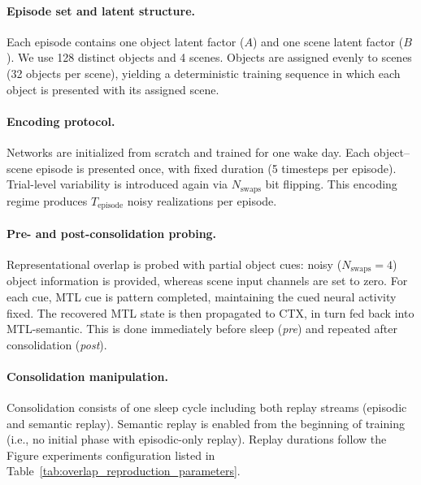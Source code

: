\documentclass{article}
\begin{document}
\paragraph{Episode set and latent structure.}
Each episode contains one object latent factor ($A$) and one scene latent factor ($B$). We use 128 distinct objects and 4 scenes. Objects are assigned evenly to scenes (32 objects per scene), yielding a deterministic training sequence in which each object is presented with its assigned scene.

\paragraph{Encoding protocol.}
Networks are initialized from scratch and trained for one wake day. Each object--scene episode is presented once, with fixed duration (5 timesteps per episode). Trial-level variability is introduced again via $N_\textrm{swaps}$ bit flipping. This encoding regime produces $T_\textrm{episode}$ noisy realizations per episode.

\paragraph{Pre- and post-consolidation probing.}
Representational overlap is probed with partial object cues: noisy ($N_\textrm{swaps} = 4$) object information is provided, whereas scene input channels are set to zero. For each cue, MTL cue is pattern completed, maintaining the cued neural activity fixed. The recovered MTL state is then propagated to CTX, in turn fed back into MTL-semantic. This is done immediately before sleep (\textit{pre}) and repeated after consolidation (\textit{post}).

\paragraph{Consolidation manipulation.}
Consolidation consists of one sleep cycle including both replay streams (episodic and semantic replay). Semantic replay is enabled from the beginning of training (i.e., no initial phase with episodic-only replay). Replay durations follow the Figure experiments configuration listed in Table~\ref{tab:overlap_reproduction_parameters}.
\end{document}
